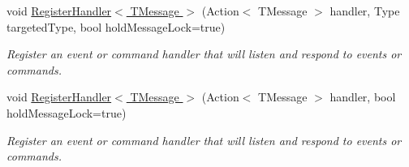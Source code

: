 \begin{DoxyCompactItemize}
void \hyperlink{classCqrs_1_1Akka_1_1Events_1_1AkkaEventBus_a59ec3e497e511b73b5239eee80691443_a59ec3e497e511b73b5239eee80691443}{Register\+Handler$<$ T\+Message $>$} (Action$<$ T\+Message $>$ handler, Type targeted\+Type, bool hold\+Message\+Lock=true)
\begin{DoxyCompactList}\small\item\em Register an event or command handler that will listen and respond to events or commands. \end{DoxyCompactList}\item 
void \hyperlink{classCqrs_1_1Akka_1_1Events_1_1AkkaEventBus_a6795dfcaf611ce1b50310f442cef0546_a6795dfcaf611ce1b50310f442cef0546}{Register\+Handler$<$ T\+Message $>$} (Action$<$ T\+Message $>$ handler, bool hold\+Message\+Lock=true)
\begin{DoxyCompactList}\small\item\em Register an event or command handler that will listen and respond to events or commands. \end{DoxyCompactList}\end{DoxyCompactItemize}
